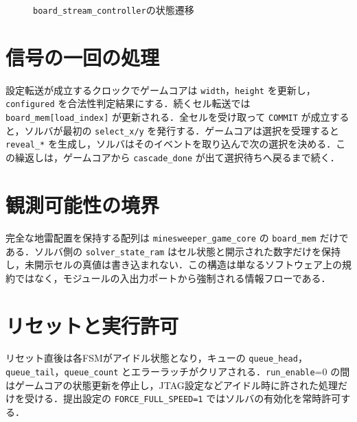 \begin{figure}[tb]
\centering
{}
\caption{\texttt{board\_stream\_controller}の状態遷移}
\label{fig:board-stream-fsm}
\end{figure}

\section{信号の一回の処理}
設定転送が成立するクロックでゲームコアは \texttt{width}，\texttt{height} を更新し，\texttt{configured} を合法性判定結果にする．続くセル転送では \texttt{board\_mem[load\_index]} が更新される．全セルを受け取って \texttt{COMMIT} が成立すると，ソルバが最初の \texttt{select\_x/y} を発行する．ゲームコアは選択を受理すると \texttt{reveal\_*} を生成し，ソルバはそのイベントを取り込んで次の選択を決める．この繰返しは，ゲームコアから \texttt{cascade\_done} が出て選択待ちへ戻るまで続く．

\section{観測可能性の境界}
完全な地雷配置を保持する配列は \texttt{minesweeper\_game\_core} の \texttt{board\_mem} だけである．ソルバ側の \texttt{solver\_state\_ram} はセル状態と開示された数字だけを保持し，未開示セルの真値は書き込まれない．この構造は単なるソフトウェア上の規約ではなく，モジュールの入出力ポートから強制される情報フローである．

\section{リセットと実行許可}
リセット直後は各FSMがアイドル状態となり，キューの \texttt{queue\_head}，\texttt{queue\_tail}，\texttt{queue\_count} とエラーラッチがクリアされる．\texttt{run\_enable}=0 の間はゲームコアの状態更新を停止し，JTAG設定などアイドル時に許された処理だけを受ける．提出設定の \texttt{FORCE\_FULL\_SPEED=1} ではソルバの有効化を常時許可する．
